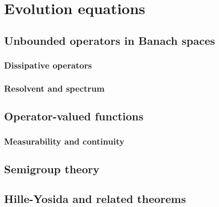 \section{Evolution equations}
\subsection{Unbounded operators in Banach spaces}

\subsubsection{Dissipative operators}
\subsubsection{Resolvent and spectrum}
\subsection{Operator-valued functions}
\subsubsection{Measurability and continuity}
\subsection{Semigroup theory}
\subsection{Hille-Yosida and related theorems}